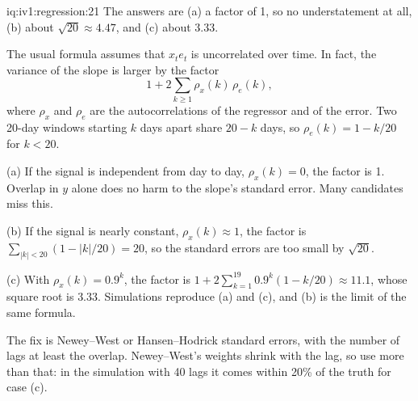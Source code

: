 \begin{solution}{iq:iv1:regression:21}
The answers are (a) a factor of 1, so no understatement at all, (b) about $\sqrt{20} \approx 4.47$, and (c) about $3.33$.

The usual formula assumes that $x_t e_t$ is uncorrelated over time. In fact, the variance of the slope is larger by the factor
\[
1 + 2 \sum_{k \ge 1} \rho_x(k)\,\rho_e(k) ,
\]
where $\rho_x$ and $\rho_e$ are the autocorrelations of the regressor and of the error. Two 20-day windows starting $k$ days apart share $20 - k$ days, so $\rho_e(k) = 1 - k/20$ for $k < 20$.

(a) If the signal is independent from day to day, $\rho_x(k) = 0$, the factor is 1. Overlap in $y$ alone does no harm to the slope's standard error. Many candidates miss this.

(b) If the signal is nearly constant, $\rho_x(k) \approx 1$, the factor is $\sum_{|k|<20}(1 - |k|/20) = 20$, so the standard errors are too small by $\sqrt{20}$.

(c) With $\rho_x(k) = 0.9^k$, the factor is $1 + 2\sum_{k=1}^{19} 0.9^k(1 - k/20) \approx 11.1$, whose square root is $3.33$. Simulations reproduce (a) and (c), and (b) is the limit of the same formula.

The fix is Newey--West or Hansen--Hodrick standard errors, with the number of lags at least the overlap. Newey--West's weights shrink with the lag, so use more than that: in the simulation with 40 lags it comes within 20\% of the truth for case (c).

\end{solution}

